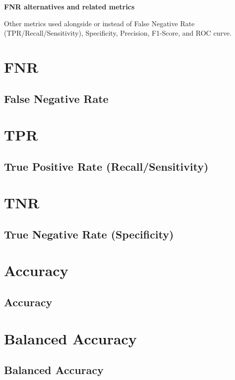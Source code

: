 \textbf{FNR alternatives and related metrics}

Other metrics used alongside or instead of False Negative Rate (TPR/Recall/Sensitivity), Specificity, Precision, F1-Score, and ROC curve.

\clearpage
\thispagestyle{classificationstyle}
\section{FNR}
\subsection{False Negative Rate}

\clearpage
\thispagestyle{classificationstyle}
\section{TPR}
\subsection{True Positive Rate (Recall/Sensitivity)}

\clearpage
\thispagestyle{classificationstyle}
\section{TNR}
\subsection{True Negative Rate (Specificity)}

\clearpage
\thispagestyle{classificationstyle}
\section{Accuracy}
\subsection{Accuracy}

\clearpage
\thispagestyle{classificationstyle}
\section{Balanced Accuracy}
\subsection{Balanced Accuracy}

